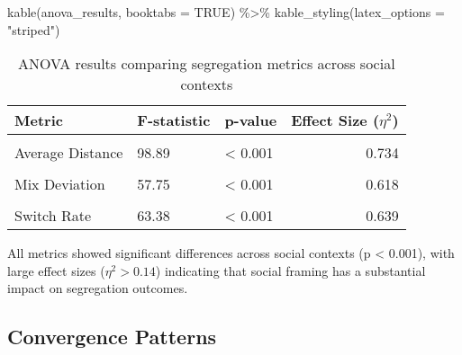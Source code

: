 \documentclass[
  11pt,
]{article}
\newenvironment{Shaded}{\begin{snugshade}}{\end{snugshade}}
\newcommand{\AttributeTok}[1]{\textcolor[rgb]{0.40,0.45,0.13}{#1}}
\newcommand{\ConstantTok}[1]{\textcolor[rgb]{0.56,0.35,0.01}{#1}}
\newcommand{\FunctionTok}[1]{\textcolor[rgb]{0.28,0.35,0.67}{#1}}
\newcommand{\NormalTok}[1]{\textcolor[rgb]{0.00,0.23,0.31}{#1}}
\newcommand{\SpecialCharTok}[1]{\textcolor[rgb]{0.37,0.37,0.37}{#1}}
\newcommand{\StringTok}[1]{\textcolor[rgb]{0.13,0.47,0.30}{#1}}
\begin{document}
\begin{Shaded}
\begin{Highlighting}[]
\FunctionTok{kable}\NormalTok{(anova\_results, }\AttributeTok{booktabs =} \ConstantTok{TRUE}\NormalTok{) }\SpecialCharTok{\%\textgreater{}\%}
  \FunctionTok{kable\_styling}\NormalTok{(}\AttributeTok{latex\_options =} \StringTok{"striped"}\NormalTok{)}
\end{Highlighting}
\end{Shaded}

\begin{longtable}[t]{lllr}
\caption{ANOVA results comparing segregation metrics across social contexts}\tabularnewline

\toprule
Metric & F-statistic & p-value & Effect Size ($\eta^2$)\\
\midrule
\cellcolor{gray!10}{Number of Clusters} & \cellcolor{gray!10}{32.65} & \cellcolor{gray!10}{< 0.001} & \cellcolor{gray!10}{0.477}\\
Average Distance & 98.89 & < 0.001 & 0.734\\
\cellcolor{gray!10}{Ghetto Formation Rate} & \cellcolor{gray!10}{73.26} & \cellcolor{gray!10}{< 0.001} & \cellcolor{gray!10}{0.672}\\
Mix Deviation & 57.75 & < 0.001 & 0.618\\
\cellcolor{gray!10}{Segregation Share} & \cellcolor{gray!10}{64.33} & \cellcolor{gray!10}{< 0.001} & \cellcolor{gray!10}{0.643}\\
\addlinespace
Switch Rate & 63.38 & < 0.001 & 0.639\\
\bottomrule
\end{longtable}

All metrics showed significant differences across social contexts (p
\textless{} 0.001), with large effect sizes ($\eta^2 > 0.14$)
indicating that social framing has a substantial impact on segregation
outcomes.

\subsection{Convergence Patterns}\label{convergence-patterns}
\end{document}
